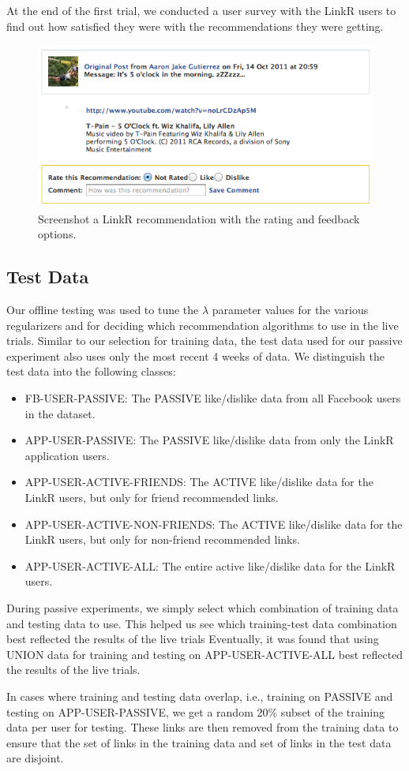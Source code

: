 At the end of the first trial, we conducted a user survey with the LinkR users to find out how satisfied they were with the recommendations they were getting.

\begin{figure}
\centering
\includegraphics[scale=0.5]{img/linkr_rating.png}
\caption{Screenshot a LinkR recommendation with the rating and feedback options.}
 \end{figure}
 
\subsection{Test Data}

Our offline testing was used to tune the $\lambda$ parameter values for the various regularizers and for deciding which recommendation algorithms to use in the live trials. Similar to our selection for training data, the test data used for our passive experiment also uses only the most recent 4 weeks of data. We distinguish the test data into the following classes:

\begin{itemize}
\item{FB-USER-PASSIVE: The PASSIVE like/dislike data from all Facebook users in the dataset.}
\item{APP-USER-PASSIVE: The PASSIVE like/dislike data from only the LinkR application users.}
\item{APP-USER-ACTIVE-FRIENDS: The ACTIVE like/dislike data for the LinkR users, but only for friend recommended links.}
\item{APP-USER-ACTIVE-NON-FRIENDS: The ACTIVE like/dislike data for the LinkR users, but only for non-friend recommended links.}
\item{APP-USER-ACTIVE-ALL: The entire active like/dislike data for the LinkR users.}
\end{itemize}

During passive experiments, we simply select which combination of training data and testing data to use. This helped us see which training-test data combination best reflected the results of the live trials Eventually, it was found that using UNION data for training and testing on APP-USER-ACTIVE-ALL best reflected the results of the live trials. 

In cases where training and testing data overlap, i.e., training on PASSIVE and testing on APP-USER-PASSIVE, we get a random 20\% subset of the training data per user for testing. These links are then removed from the training data to ensure that the set of links in the training data and set of links in the test data are disjoint.
